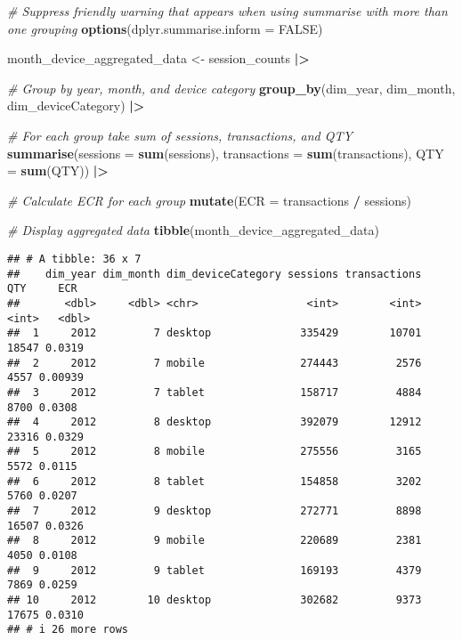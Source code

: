 \documentclass[
]{article}
\newenvironment{Shaded}{\begin{snugshade}}{\end{snugshade}}
\newcommand{\AttributeTok}[1]{\textcolor[rgb]{0.13,0.29,0.53}{#1}}
\newcommand{\CommentTok}[1]{\textcolor[rgb]{0.56,0.35,0.01}{\textit{#1}}}
\newcommand{\ConstantTok}[1]{\textcolor[rgb]{0.56,0.35,0.01}{#1}}
\newcommand{\FunctionTok}[1]{\textcolor[rgb]{0.13,0.29,0.53}{\textbf{#1}}}
\newcommand{\NormalTok}[1]{#1}
\newcommand{\OtherTok}[1]{\textcolor[rgb]{0.56,0.35,0.01}{#1}}
\newcommand{\SpecialCharTok}[1]{\textcolor[rgb]{0.81,0.36,0.00}{\textbf{#1}}}
\begin{document}
\begin{Shaded}
\begin{Highlighting}[]
\CommentTok{\# Suppress friendly warning that appears when using \textasciigrave{}summarise\textasciigrave{} with more than one grouping}
\FunctionTok{options}\NormalTok{(}\AttributeTok{dplyr.summarise.inform =} \ConstantTok{FALSE}\NormalTok{)}

\NormalTok{month\_device\_aggregated\_data }\OtherTok{\textless{}{-}}\NormalTok{ session\_counts }\SpecialCharTok{|\textgreater{}}
  
  \CommentTok{\# Group by year, month, and device category}
  \FunctionTok{group\_by}\NormalTok{(dim\_year, dim\_month, dim\_deviceCategory) }\SpecialCharTok{|\textgreater{}}
  
  \CommentTok{\# For each group take sum of sessions, transactions, and QTY}
  \FunctionTok{summarise}\NormalTok{(}\AttributeTok{sessions =} \FunctionTok{sum}\NormalTok{(sessions),}
            \AttributeTok{transactions =} \FunctionTok{sum}\NormalTok{(transactions),}
            \AttributeTok{QTY =} \FunctionTok{sum}\NormalTok{(QTY)) }\SpecialCharTok{|\textgreater{}}
  
  \CommentTok{\# Calculate ECR for each group}
  \FunctionTok{mutate}\NormalTok{(}\AttributeTok{ECR =}\NormalTok{ transactions }\SpecialCharTok{/}\NormalTok{ sessions)}

\CommentTok{\# Display aggregated data}
\FunctionTok{tibble}\NormalTok{(month\_device\_aggregated\_data)}
\end{Highlighting}
\end{Shaded}

\begin{verbatim}
## # A tibble: 36 x 7
##    dim_year dim_month dim_deviceCategory sessions transactions   QTY     ECR
##       <dbl>     <dbl> <chr>                 <int>        <int> <int>   <dbl>
##  1     2012         7 desktop              335429        10701 18547 0.0319 
##  2     2012         7 mobile               274443         2576  4557 0.00939
##  3     2012         7 tablet               158717         4884  8700 0.0308 
##  4     2012         8 desktop              392079        12912 23316 0.0329 
##  5     2012         8 mobile               275556         3165  5572 0.0115 
##  6     2012         8 tablet               154858         3202  5760 0.0207 
##  7     2012         9 desktop              272771         8898 16507 0.0326 
##  8     2012         9 mobile               220689         2381  4050 0.0108 
##  9     2012         9 tablet               169193         4379  7869 0.0259 
## 10     2012        10 desktop              302682         9373 17675 0.0310 
## # i 26 more rows
\end{verbatim}
\end{document}
